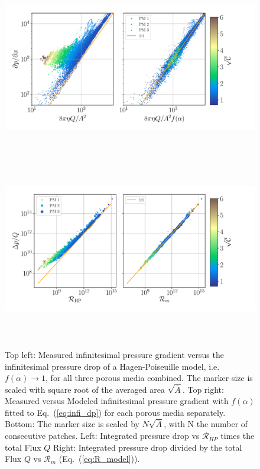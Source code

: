\documentclass[draft]{agujournal2019}
\begin{document}
\begin{figure}
\includegraphics[height=8cm]{figures/infi_dpdx_combined.pdf}
\includegraphics[height=8cm]{figures/integral_R_combined.pdf}
\caption{Top left: Measured infinitesimal pressure gradient versus the infinitesimal pressure drop of a Hagen-Poiseuille model, i.e. $f(\alpha)\rightarrow 1$, for all three porous media combined. The marker size is scaled with square root of the averaged area $\sqrt{\overline{A}}$. Top right: Measured versus Modeled infinitesimal pressure gradient with $f(\alpha)$ fitted to Eq.~(\ref{eq:infi_dp}) for each porous media separately. Bottom: The marker size is scaled by $N\sqrt{\overline{A}}$, with N the number of consecutive patches. Left: Integrated pressure drop vs $\mathcal{R}_{HP}$ times the total Flux $Q$ Right: Integrated pressure drop divided by the total Flux $Q$ vs $\mathcal{R}_m$ (Eq.~(\ref{eq:R_model})). }
\label{fig:local_and_integrated}
\end{figure}
\end{document}
